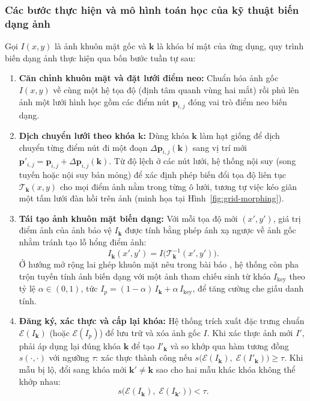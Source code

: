 \documentclass[oneside,a4paper,12pt]{extarticle}
\begin{document}
\subsubsection*{Các bước thực hiện và mô hình toán học của kỹ thuật biến dạng ảnh}
Gọi $I(x, y)$ là ảnh khuôn mặt gốc và $\mathbf{k}$ là khóa bí mật của ứng dụng, quy trình biến dạng ảnh thực hiện qua bốn bước tuần tự sau:
\begin{enumerate}\setlength{\itemsep}{2pt}\setlength{\parskip}{0pt}
    \item \textbf{Căn chỉnh khuôn mặt và đặt lưới điểm neo:} Chuẩn hóa ảnh gốc $I(x, y)$ về cùng một hệ tọa độ (định tâm quanh vùng hai mắt) rồi phủ lên ảnh một lưới hình học gồm các điểm nút $\mathbf{p}_{i,j}$ đóng vai trò điểm neo biến dạng.
    \item \textbf{Dịch chuyển lưới theo khóa $\mathbf{k}$:} Dùng khóa $\mathbf{k}$ làm hạt giống để dịch chuyển từng điểm nút đi một đoạn $\Delta \mathbf{p}_{i,j}(\mathbf{k})$ sang vị trí mới $\mathbf{p}'_{i,j} = \mathbf{p}_{i,j} + \Delta \mathbf{p}_{i,j}(\mathbf{k})$. Từ độ lệch ở các nút lưới, hệ thống nội suy (song tuyến hoặc nội suy bản mỏng) để xác định phép biến đổi tọa độ liên tục $\mathcal{T}_{\mathbf{k}}(x, y)$ cho mọi điểm ảnh nằm trong từng ô lưới, tương tự việc kéo giãn một tấm lưới đàn hồi trên ảnh (minh họa tại Hình~\ref{fig:grid-morphing}).
    \item \textbf{Tái tạo ảnh khuôn mặt biến dạng:} Với mỗi tọa độ mới $(x', y')$, giá trị điểm ảnh của ảnh bảo vệ $I_{\mathbf{k}}$ được tính bằng phép ánh xạ ngược về ảnh gốc nhằm tránh tạo lỗ hổng điểm ảnh:
    \[
    I_{\mathbf{k}}(x', y') = I\bigl(\mathcal{T}_{\mathbf{k}}^{-1}(x', y')\bigr).
    \]
    Ở hướng mở rộng lai ghép khuôn mặt nêu trong bài báo \cite{ghafourian2023, alam2025}, hệ thống còn pha trộn tuyến tính ảnh biến dạng với một ảnh tham chiếu sinh từ khóa $I_{\text{key}}$ theo tỷ lệ $\alpha \in (0, 1)$, tức $I_p = (1 - \alpha)\, I_{\mathbf{k}} + \alpha\, I_{\text{key}}$, để tăng cường che giấu danh tính.
    \item \textbf{Đăng ký, xác thực và cấp lại khóa:} Hệ thống trích xuất đặc trưng chuẩn $\mathcal{E}(I_{\mathbf{k}})$ (hoặc $\mathcal{E}(I_p)$) để lưu trữ và xóa ảnh gốc $I$. Khi xác thực ảnh mới $I'$, phải áp dụng lại đúng khóa $\mathbf{k}$ để tạo $I'_{\mathbf{k}}$ và so khớp qua hàm tương đồng $s(\cdot, \cdot)$ với ngưỡng $\tau$: xác thực thành công nếu $s\bigl(\mathcal{E}(I_{\mathbf{k}}),\; \mathcal{E}(I'_{\mathbf{k}})\bigr) \ge \tau$. Khi mẫu bị lộ, đổi sang khóa mới $\mathbf{k}' \neq \mathbf{k}$ sao cho hai mẫu khác khóa không thể khớp nhau:
    \[
    s\bigl(\mathcal{E}(I_{\mathbf{k}}),\; \mathcal{E}(I_{\mathbf{k}'})\bigr) < \tau.
    \]
\end{enumerate}
\end{document}

